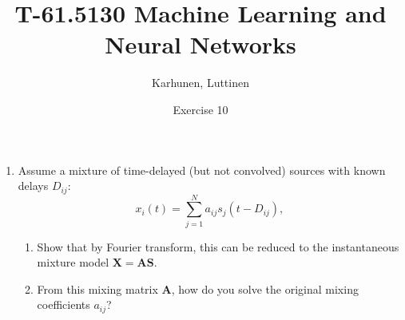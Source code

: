 
\title{T-61.5130 Machine Learning and Neural Networks}
\author{Karhunen, Luttinen}
\date{Exercise 10}

\usepackage{cancel}

\newcommand{\vect}[1]{{\bf{#1}}}
\newcommand{\svect}[1]{\boldsymbol{#1}}
\newcommand{\matr}[1]{\boldsymbol{#1}}




\maketitle
\thispagestyle{empty}

\begin{enumerate}


\item Assume a mixture of time-delayed (but not convolved) sources with known delays $D_{ij}$:
  \begin{displaymath}
    x_i(t) = \sum_{j=1}^N a_{ij}s_j(t-D_{ij}),
  \end{displaymath}
  \begin{enumerate}
  \item Show that by Fourier transform, this can be reduced to the instantaneous mixture
    model $\mathbf{X} = \mathbf{A} \mathbf{S}$.
  \item From this mixing matrix $\mathbf{A}$, how do you solve the original mixing
    coefficients $a_{ij}$?
  \end{enumerate}

  \begin{solution}



\end{solution}
\end{enumerate}
